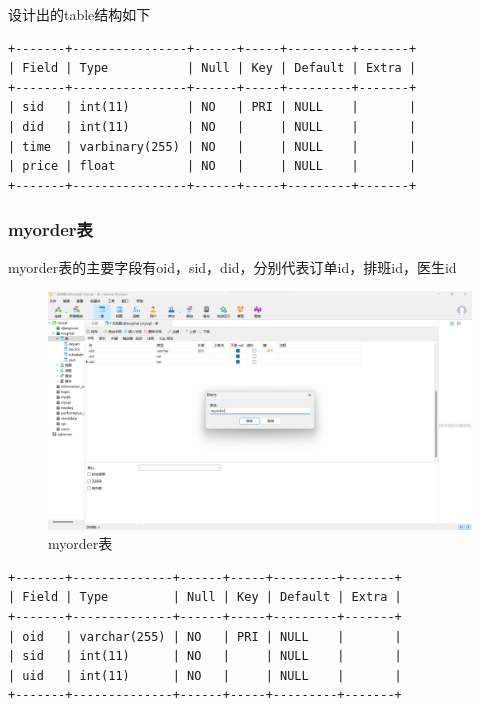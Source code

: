 \documentclass[UTF8,12pt]{article}
\begin{document}
设计出的table结构如下

\begin{lstlisting}[frame=shadowbox]
+-------+----------------+------+-----+---------+-------+
| Field | Type           | Null | Key | Default | Extra |
+-------+----------------+------+-----+---------+-------+
| sid   | int(11)        | NO   | PRI | NULL    |       |
| did   | int(11)        | NO   |     | NULL    |       |
| time  | varbinary(255) | NO   |     | NULL    |       |
| price | float          | NO   |     | NULL    |       |
+-------+----------------+------+-----+---------+-------+
\end{lstlisting}

\newpage

\subsubsection{myorder表}

myorder表的主要字段有oid，sid，did，分别代表订单id，排班id，医生id

\begin{figure}[htbp]
    \centering
    \includegraphics[width=1.0\textwidth]{imgs/9.png}
    \caption{myorder表}
\end{figure}

\begin{lstlisting}[frame=shadowbox]
+-------+--------------+------+-----+---------+-------+
| Field | Type         | Null | Key | Default | Extra |
+-------+--------------+------+-----+---------+-------+
| oid   | varchar(255) | NO   | PRI | NULL    |       |
| sid   | int(11)      | NO   |     | NULL    |       |
| uid   | int(11)      | NO   |     | NULL    |       |
+-------+--------------+------+-----+---------+-------+
\end{lstlisting}
\end{document}
